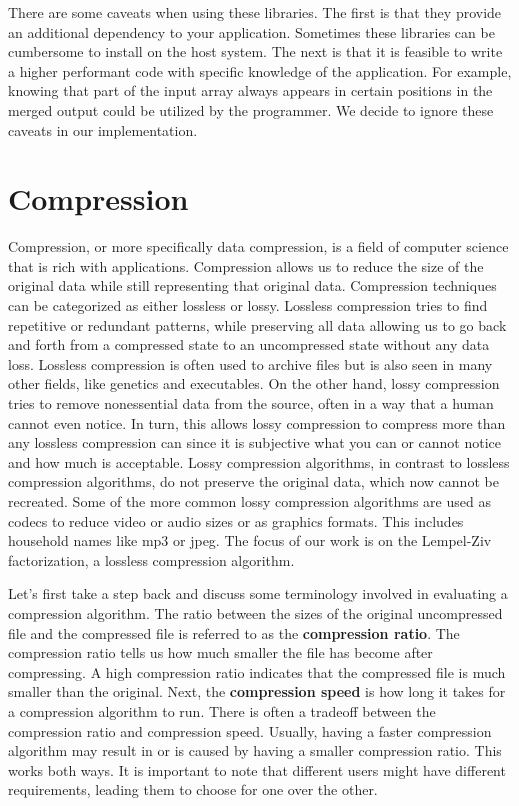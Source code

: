 There are some caveats when using these libraries.
The first is that they provide an additional dependency to your application.
Sometimes these libraries can be cumbersome to install on the host system.
The next is that it is feasible to write a higher performant code with specific knowledge of the application.
For example, knowing that part of the input array always appears in certain positions in the merged output could be utilized by the programmer.
We decide to ignore these caveats in our implementation.

\section{Compression}

Compression, or more specifically data compression, is a field of computer science that is rich with applications.
Compression allows us to reduce the size of the original data while still representing that original data.
Compression techniques can be categorized as either lossless or lossy.
Lossless compression tries to find repetitive or redundant patterns, while preserving all data allowing us to go back and forth from a compressed state to an uncompressed state without any data loss. 
Lossless compression is often used to archive files but is also seen in many other fields, like genetics and executables.
On the other hand, lossy compression tries to remove nonessential data from the source, often in a way that a human cannot even notice.
In turn, this allows lossy compression to compress more than any lossless compression can since it is subjective what you can or cannot notice and how much is acceptable.
Lossy compression algorithms, in contrast to lossless compression algorithms, do not preserve the original data, which now cannot be recreated.
Some of the more common lossy compression algorithms are used as codecs to reduce video or audio sizes or as graphics formats.
This includes household names like mp3 or jpeg.
The focus of our work is on the Lempel-Ziv factorization, a lossless compression algorithm.

Let's first take a step back and discuss some terminology involved in evaluating a compression algorithm.
The ratio between the sizes of the original uncompressed file and the compressed file is referred to as the \textbf{compression ratio}.
The compression ratio tells us how much smaller the file has become after compressing.
A high compression ratio indicates that the compressed file is much smaller than the original.
Next, the \textbf{compression speed} is how long it takes for a compression algorithm to run.
There is often a tradeoff between the compression ratio and compression speed.
Usually, having a faster compression algorithm may result in or is caused by having a smaller compression ratio.
This works both ways.
It is important to note that different users might have different requirements, leading them to choose for one over the other.


